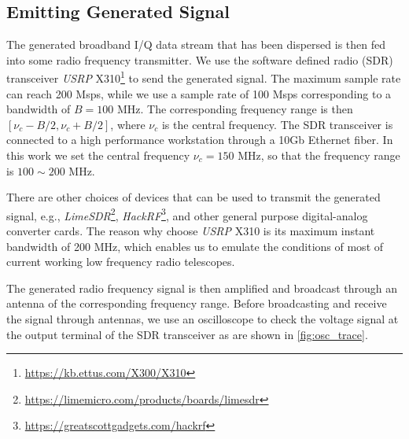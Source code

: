 \documentclass[fleqn,usenatbib]{mnras}
\begin{document}
\subsection{Emitting Generated Signal}
The generated broadband I/Q data stream that has been dispersed is then fed into some radio frequency transmitter.
We use the software defined radio (SDR) transceiver \textit{USRP} X310\footnote{\url{https://kb.ettus.com/X300/X310}} to send the generated signal.
The maximum sample rate can reach 200 Msps, while we use a sample rate of 100 Msps corresponding to a bandwidth of $B=100$ MHz.
The corresponding frequency range is then $[\nu_c-B/2, \nu_c+B/2]$, where $\nu_c$ is the central frequency.
The SDR transceiver is connected to a high performance workstation through a 10Gb Ethernet fiber.
In this work we set the central frequency $\nu_c=150$ MHz, so that the frequency range is $100\sim 200$ MHz.


There are other choices of devices that can be used to transmit the generated signal, e.g.,  \textit{LimeSDR}\footnote{\url{https://limemicro.com/products/boards/limesdr}}, 
\textit{HackRF}\footnote{\url{https://greatscottgadgets.com/hackrf}}, and other general purpose digital-analog converter cards. 
The reason why choose \textit{USRP} X310 is its maximum instant bandwidth of 200 MHz, which enables us to emulate the conditions of most of current working low frequency radio telescopes.

The generated radio frequency signal is then amplified and broadcast through an antenna of the corresponding frequency range.
Before broadcasting and receive the signal through antennas, we use an oscilloscope to check the voltage signal at the output terminal of the SDR transceiver as are shown in \ref{fig:osc_trace}.
\end{document}
